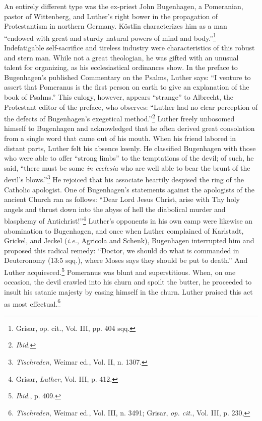 An entirely different type was the ex-priest John Bugenhagen, a
Pomeranian, pastor of Wittenberg, and Luther’s right bower in the
propagation of Protestantism in northern Germany. Köstlin characterizes
him as a man “endowed with great and sturdy natural powers
of mind and body.”\footnote{Grisar, op. cit., Vol. III, pp. 404 sqq.}
 Indefatigable self-sacrifice and tireless industry
were characteristics of this robust and stern man. While not a great
theologian, he was gifted with an unusual talent for organizing, as
his ecclesiastical ordinances show. In the preface to Bugenhagen’s
published Commentary on the Psalms, Luther says: “I venture to
assert that Pomeranus is the first person on earth to give an explanation
of the book of Psalms.” This eulogy, however, appears “strange”
to Albrecht, the Protestant editor of the preface, who observes:
“Luther had no clear perception of the defects of Bugenhagen’s exegetical
method.”\footnote{\textit{Ibid.}}
 Luther freely unbosomed himself to Bugenhagen
and acknowledged that he often derived great consolation from a
single word that came out of his mouth. When his friend labored in
distant parts, Luther felt his absence keenly. He classified Bugenhagen
with those who were able to offer “strong limbs” to the temptations
of the devil; of such, he said, “there must be some \textit{in ecclesia} who are
well able to bear the brunt of the devil’s blows.”\footnote{\textit{Tischreden}, Weimar ed., Vol. II, n. 1307.}
He rejoiced that
his associate heartily despised the ring of the Catholic apologist. One
of Bugenhagen’s statements against the apologists of the ancient
Church ran as follows: “Dear Lord Jesus Christ, arise with Thy holy
angels and thrust down into the abyss of hell the diabolical murder
and blasphemy of Antichrist!”\footnote{Grisar, \textit{Luther}, Vol. III, p. 412.}
 Luther’s opponents in his own camp
were likewise an abomination to Bugenhagen, and once when Luther
complained of Karlstadt, Grickel, and Jeckel (\textit{i.e.}, Agricola and
Schenk), Bugenhagen interrupted him and proposed this radical
remedy: “Doctor, we should do what is commanded in Deuteronomy
(13:5 sqq.), where Moses says they should be put to death.” And
Luther acquiesced.\footnote{\textit{Ibid.}, p. 409.}
 Pomeranus was blunt and superstitious. When,
on one occasion, the devil crawled into his churn and spoilt the butter,
he proceeded to insult his satanic majesty by easing himself in the
churn. Luther praised this act as most effectual.\footnote
{\textit{Tischreden}, Weimar ed., Vol. III, n. 3491; Grisar, \textit{op. cit.}, Vol. III, p. 230,}

